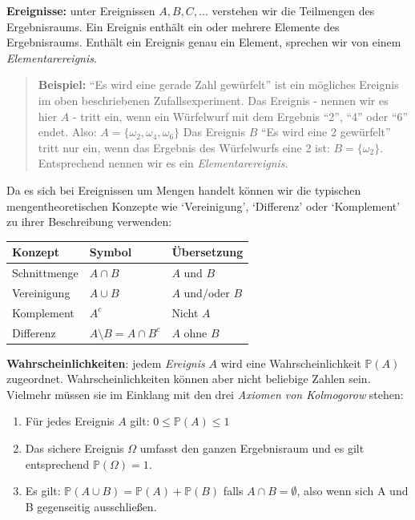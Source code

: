 \documentclass[]{book}
\begin{document}
\textbf{Ereignisse:} unter Ereignissen \(A, B, C,...\) verstehen wir die
Teilmengen des Ergebnisraums. Ein Ereignis enthält ein oder mehrere
Elemente des Ergebnisraums. Enthält ein Ereignis genau ein Element,
sprechen wir von einem \emph{Elementarereignis}.

\begin{quote}
\textbf{Beispiel:} ``Es wird eine gerade Zahl gewürfelt'' ist ein
mögliches Ereignis im oben beschriebenen Zufallsexperiment. Das Ereignis
- nennen wir es hier \(A\) - tritt ein, wenn ein Würfelwurf mit dem
Ergebnis ``2'', ``4'' oder ``6'' endet. Also:
\(A=\{\omega_2, \omega_4, \omega_6\}\) Das Ereignis \(B\) ``Es wird eine
2 gewürfelt'' tritt nur ein, wenn das Ergebnis des Würfelwurfs eine 2
ist: \(B=\{\omega_2\}\). Entsprechend nennen wir es ein
\emph{Elementarereignis}.
\end{quote}

Da es sich bei Ereignissen um Mengen handelt können wir die typischen
mengentheoretischen Konzepte wie `Vereinigung', `Differenz' oder
`Komplement' zu ihrer Beschreibung verwenden:

\begin{longtable}[]{@{}lll@{}}
\toprule
Konzept & Symbol & Übersetzung\tabularnewline
\midrule
\endhead
Schnittmenge & \(A\cap B\) & \(A\) und \(B\)\tabularnewline
Vereinigung & \(A\cup B\) & \(A\) und/oder \(B\)\tabularnewline
Komplement & \(A^c\) & Nicht \(A\)\tabularnewline
Differenz & \(A \setminus B = A\cap B^c\) & \(A\) ohne
\(B\)\tabularnewline
\bottomrule
\end{longtable}

\textbf{Wahrscheinlichkeiten}: jedem \emph{Ereignis} \(A\) wird eine
Wahrscheinlichkeit \(\mathbb{P}(A)\) zugeordnet. Wahrscheinlichkeiten
können aber nicht beliebige Zahlen sein. Vielmehr müssen sie im Einklang
mit den drei \emph{Axiomen von Kolmogorow} stehen:

\begin{enumerate}
\def\labelenumi{\arabic{enumi}.}
\item
  Für jedes Ereignis \(A\) gilt: \(0\leq\mathbb{P}(A)\leq1\)
\item
  Das sichere Ereignis \(\Omega\) umfasst den ganzen Ergebnisraum und es
  gilt entsprechend \(\mathbb{P}(\Omega)=1\).
\item
  Es gilt: \(\mathbb{P}(A\cup B) = \mathbb{P}(A)+\mathbb{P}(B)\) falls
  \(A\cap B=\emptyset\), also wenn sich A und B gegenseitig
  ausschließen.
\end{enumerate}
\end{document}
